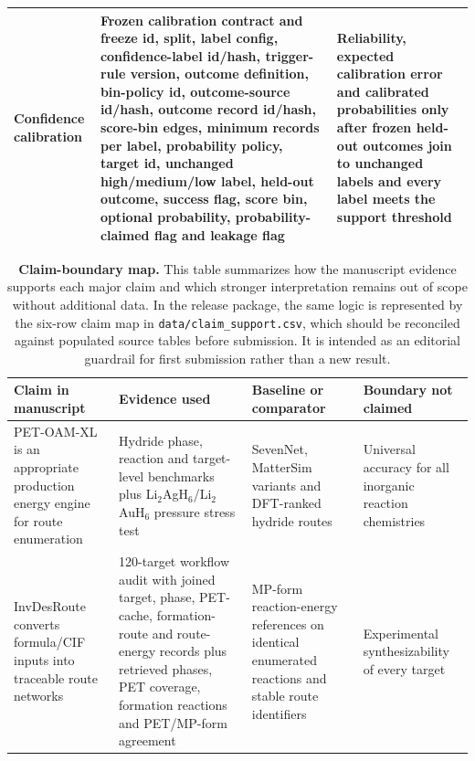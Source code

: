 \documentclass[11pt, letterpaper]{article}
\begin{document}
\begin{table}[p]
\begin{tabular}{L{0.20\textwidth}L{0.50\textwidth}L{0.20\textwidth}}
Confidence calibration & Frozen calibration contract and freeze id, split, label config, confidence-label id/hash, trigger-rule version, outcome definition, bin-policy id, outcome-source id/hash, outcome record id/hash, score-bin edges, minimum records per label, probability policy, target id, unchanged high/medium/low label, held-out outcome, success flag, score bin, optional probability, probability-claimed flag and leakage flag & Reliability, expected calibration error and calibrated probabilities only after frozen held-out outcomes join to unchanged labels and every label meets the support threshold \\
\bottomrule
\end{tabular}
\label{supp-tab:validation_upgrade_tables}
\end{table}

\begin{table}[p]
\centering
\scriptsize
\caption{\textbf{Claim-boundary map.} This table summarizes how the manuscript evidence supports each major claim and which stronger interpretation remains out of scope without additional data. In the release package, the same logic is represented by the six-row claim map in \texttt{data/claim\_support.csv}, which should be reconciled against populated source tables before submission. It is intended as an editorial guardrail for first submission rather than a new result.}
\begin{tabular}{L{0.23\textwidth}L{0.30\textwidth}L{0.19\textwidth}L{0.16\textwidth}}
\toprule
\textbf{Claim in manuscript} & \textbf{Evidence used} & \textbf{Baseline or comparator} & \textbf{Boundary not claimed} \\
\midrule
PET-OAM-XL is an appropriate production energy engine for route enumeration & Hydride phase, reaction and target-level benchmarks plus Li$_2$AgH$_6$/Li$_2$AuH$_6$ pressure stress test & SevenNet, MatterSim variants and DFT-ranked hydride routes & Universal accuracy for all inorganic reaction chemistries \\
InvDesRoute converts formula/CIF inputs into traceable route networks & 120-target workflow audit with joined target, phase, PET-cache, formation-route and route-energy records plus retrieved phases, PET coverage, formation reactions and PET/MP-form agreement & MP-form reaction-energy references on identical enumerated reactions and stable route identifiers & Experimental synthesizability of every target \\

\end{tabular}
\end{table}
\end{document}
